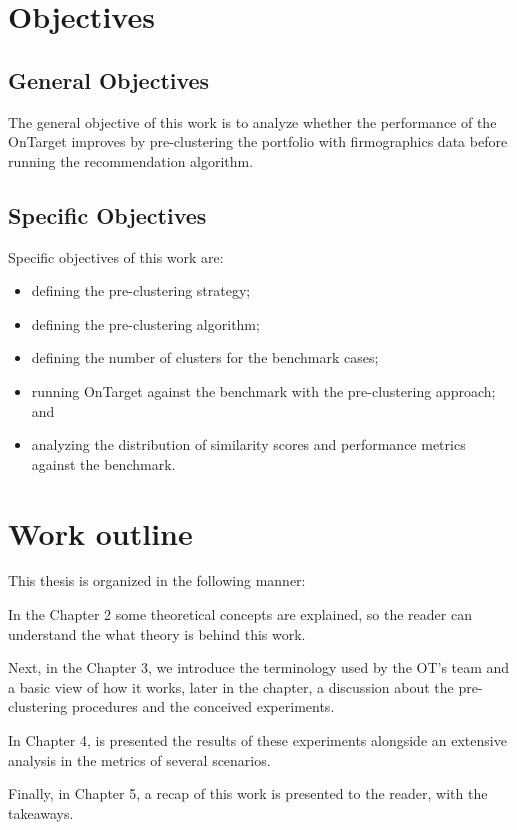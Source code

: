 \section{Objectives}

\subsection{General Objectives}

The general objective of this work is to analyze whether the performance of the OnTarget improves by pre-clustering the portfolio with firmographics data before running the recommendation algorithm.

\subsection{Specific Objectives}

Specific objectives of this work are:

\begin{itemize}
    \item defining the pre-clustering strategy;
	\item defining the pre-clustering algorithm;
    \item defining the number of clusters for the benchmark cases;
    \item running OnTarget against the benchmark with the pre-clustering approach; and
    \item analyzing the distribution of similarity scores and performance metrics against the benchmark.
\end{itemize}


\section{Work outline}

This thesis is organized in the following manner: 

In the Chapter 2 some theoretical concepts are explained, so the reader can understand the what theory is behind this work. 

Next, in the Chapter 3, we introduce the terminology used by the OT's team and a basic view of how it works, later in the chapter, a discussion about the pre-clustering procedures and the conceived experiments.

In Chapter 4, is presented the results of these experiments alongside an extensive analysis in the metrics of several scenarios. 
 
Finally, in Chapter 5, a recap of this work is presented to the reader, with the takeaways. 
